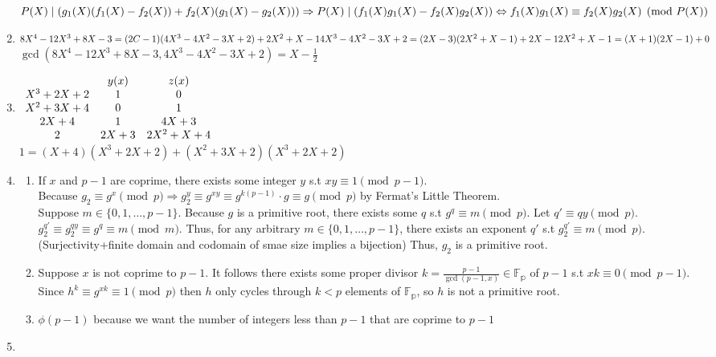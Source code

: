 \documentclass[10pt]{article}
\begin{document}
\begin{enumerate}[label= \arabic*.]
    $P(X)\mid (g_1(X)(f_1(X)-f_2(X))+f_2(X)(g_1(X)-g_2(X)))\\
    \Rightarrow P(X)\mid (f_1(X)g_1(X)-f_2(X)g_2(X))\\
    \Leftrightarrow f_1(X)g_1(X)\equiv f_2(X)g_2(X)\pmod{P(X)}$
    \item $8X^4-12X^3+8X-3=(2C-1)(4X^3-4X^2-3X+2)+2X^2+X-1\\
4X^3-4X^2-3X+2=(2X-3)(2X^2+X-1)+2X-1\\
2X^2+X-1=(X+1)(2X-1)+0$\\
$\gcd(8X^4-12X^3+8X-3,4X^3-4X^2-3X+2)=X-\frac{1}{2}$
\item $\begin{array}{c c c}
    & y(x) & z(x)\\
    X^3+2X+2 & 1 & 0\\
    X^2+3X+4 & 0 & 1\\
    2X+4 & 1 & 4X+3\\
    2 & 2X+3 & 2X^2+X+4
\end{array}$\\
$1=(X+4)(X^3+2X+2)+(X^2+3X+2)(X^3+2X+2)$
\item \begin{enumerate}
    \item If $x$ and $p-1$ are coprime, there exists some integer $y$ s.t $xy\equiv 1\pmod{p-1}$. \\
    Because $g_2\equiv g^x\pmod{p}\Rightarrow g_2^y\equiv g^{xy}\equiv g^{k(p-1)}\cdot g\equiv g\pmod{p}$ by Fermat's Little Theorem.\\
    Suppose $m\in\{0,1,\ldots,p-1\}$. Because $g$ is a primitive root, there exists some $q$ s.t $g^q\equiv m\pmod{p}$. 
    Let $q'\equiv qy\pmod{p}$.
    $g_2^{q'}\equiv g_2^{qy}\equiv g^q\equiv m\pmod{m}$. 
    Thus, for any arbitrary $m\in\{0,1,\ldots,p-1\}$, there exists an exponent $q'$ s.t $g_2^{q'}\equiv m\pmod{p}$.
    (Surjectivity+finite domain and codomain of smae size implies a bijection)
    Thus, $g_2$ is a primitive root.
    \item Suppose $x$ is not coprime to $p-1$. It follows there exists some proper divisor $k=\frac{p-1}{\gcd(p-1,x)}\in\mathbb{F_p}$ of $p-1$ s.t $xk\equiv 0\pmod{p-1}$. 
    Since $h^k\equiv g^{xk}\equiv 1\pmod{p}$ then $h$ only cycles through $k<p$ elements of $\mathbb{F_p}$, so $h$ is not a primitive root.
    \item $\phi(p-1)$ because we want the number of integers less than $p-1$ that are coprime to $p-1$
\end{enumerate}
\item \begin{enumerate}

\end{enumerate}
\end{enumerate}
\end{document}
